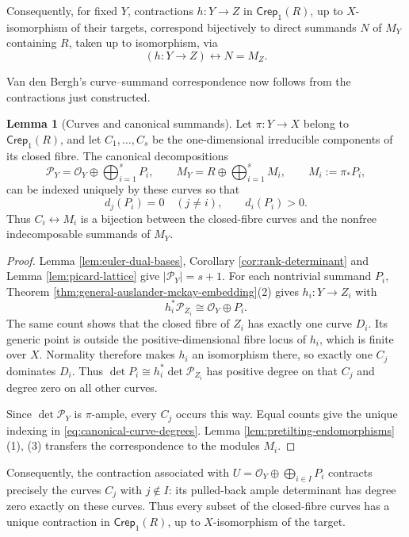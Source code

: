 \documentclass[a4paper,reqno]{amsart}
\def\O{\mathcal{O}}
\def\P{\mathcal{P}}
\theoremstyle{definition}
\newtheorem{Lem}[Thm]{Lemma}
\begin{document}
Consequently, for fixed $Y$, contractions $h\colon Y\to Z$ in $\mathsf{Crep}_1(R)$, up to $X$-isomorphism of their targets, correspond bijectively to direct summands $N$ of $M_Y$ containing $R$, taken up to isomorphism, via
\begin{equation}\label{eq:canonical-summand-contractions}
(h\colon Y\to Z)\longleftrightarrow N=M_Z.
\end{equation}

Van den Bergh's curve--summand correspondence \cite[Sections 3.4--3.5, especially Proposition 3.5.4 and Theorem 3.5.5]{VdB04b} now follows from the contractions just constructed.

\begin{Lem}[Curves and canonical summands]\label{lem:canonical-curve-summands}
Let $\pi\colon Y\to X$ belong to $\mathsf{Crep}_1(R)$, and let $C_1,\ldots,C_s$ be the one-dimensional irreducible components of its closed fibre. The canonical decompositions
\[
\P_Y=\O_Y\oplus\bigoplus_{i=1}^s P_i,\qquad
M_Y=R\oplus\bigoplus_{i=1}^s M_i,\qquad M_i:=\pi_*P_i,
\]
can be indexed uniquely by these curves so that
\begin{equation}\label{eq:canonical-curve-degrees}
d_j(P_i)=0\quad(j\ne i),\qquad d_i(P_i)>0.
\end{equation}
Thus $C_i\longleftrightarrow M_i$ is a bijection between the closed-fibre curves and the nonfree indecomposable summands of $M_Y$.
\end{Lem}
\begin{proof}
Lemma \ref{lem:euler-dual-bases}, Corollary \ref{cor:rank-determinant} and Lemma \ref{lem:picard-lattice} give $|\P_Y|=s+1$. For each nontrivial summand $P_i$, Theorem \ref{thm:general-auslander-mckay-embedding}(2) gives $h_i\colon Y\to Z_i$ with
\[
h_i^*\P_{Z_i}\cong\O_Y\oplus P_i.
\]
The same count shows that the closed fibre of $Z_i$ has exactly one curve $D_i$. Its generic point is outside the positive-dimensional fibre locus of $h_i$, which is finite over $X$. Normality therefore makes $h_i$ an isomorphism there, so exactly one $C_j$ dominates $D_i$. Thus $\det P_i\cong h_i^*\det\P_{Z_i}$ has positive degree on that $C_j$ and degree zero on all other curves.

Since $\det\P_Y$ is $\pi$-ample, every $C_j$ occurs this way. Equal counts give the unique indexing in \eqref{eq:canonical-curve-degrees}. Lemma \ref{lem:pretilting-endomorphisms}(1), (3) transfers the correspondence to the modules $M_i$.
\end{proof}

Consequently, the contraction associated with $U=\O_Y\oplus\bigoplus_{i\in I}P_i$ contracts precisely the curves $C_j$ with $j\notin I$: its pulled-back ample determinant has degree zero exactly on these curves. Thus every subset of the closed-fibre curves has a unique contraction in $\mathsf{Crep}_1(R)$, up to $X$-isomorphism of the target.
\end{document}

